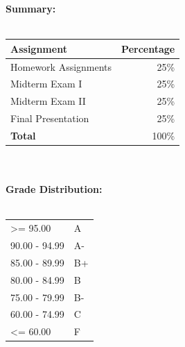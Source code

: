 \documentclass[11pt]{article}
\begin{document}
\newpage
\def\arraystretch{1}%
\textbf {\large Summary:} \\\\
\hspace*{10mm}
\begin{tabular}{ l | r } 
\textbf{Assignment} & \textbf{Percentage} \\
\hline
Homework Assignments & 25\% \\
Midterm Exam I & 25\% \\
Midterm Exam II & 25\% \\
Final Presentation &  25\% \\
\hline
\textbf{Total} & 100\% \\
\end{tabular} \\\\

\textbf {\large Grade Distribution:} \\\\
\hspace*{10mm}
\begin{tabular}{ l l }
\textgreater= 95.00 & A \\
90.00 - 94.99 & A-  \\
85.00 - 89.99 & B+   \\
80.00 - 84.99 & B  \\
75.00 - 79.99 & B-  \\
60.00 - 74.99 & C  \\
\textless= 60.00 & F \\
\end{tabular} \\\\
\end{document}
